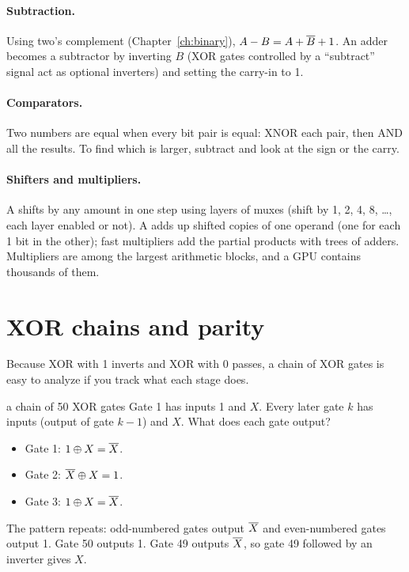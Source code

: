 \paragraph{Subtraction.} Using two's complement (Chapter~\ref{ch:binary}), $A - B = A + \overline{B} + 1$. An adder becomes a subtractor by inverting $B$ (XOR gates controlled by a ``subtract'' signal act as optional inverters) and setting the carry-in to 1.

\paragraph{Comparators.} Two numbers are equal when every bit pair is equal: XNOR each pair, then AND all the results. To find which is larger, subtract and look at the sign or the carry.

\paragraph{Shifters and multipliers.} A  shifts by any amount in one step using layers of muxes (shift by 1, 2, 4, 8, \ldots, each layer enabled or not). A  adds up shifted copies of one operand (one for each 1 bit in the other); fast multipliers add the partial products with trees of adders. Multipliers are among the largest arithmetic blocks, and a GPU contains thousands of them.

\section{XOR chains and parity}
\label{sec:xorchain}

Because XOR with 1 inverts and XOR with 0 passes, a chain of XOR gates is easy to analyze if you track what each stage does.

\begin{worked}{a chain of 50 XOR gates}
Gate 1 has inputs 1 and $X$. Every later gate $k$ has inputs (output of gate $k-1$) and $X$. What does each gate output?
\begin{itemize}
  \item Gate 1: $1 \oplus X = \overline{X}$.
  \item Gate 2: $\overline{X} \oplus X = 1$.
  \item Gate 3: $1 \oplus X = \overline{X}$.
\end{itemize}
The pattern repeats: odd-numbered gates output $\overline{X}$ and even-numbered gates output 1. Gate 50 outputs 1. Gate 49 outputs $\overline{X}$, so gate 49 followed by an inverter gives $X$.
\end{worked}

